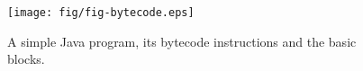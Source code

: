 
\begin{figure}[!ht]
\begin{center}
\texttt{[image: fig/fig-bytecode.eps]}
\caption{A simple Java program, its bytecode instructions and the
basic blocks.}\label{fig-bytecode}
\end{center}
\end{figure}


\begin{comment}
\scriptsize
\begin{tabular}{lll}
\begin{minipage}{0.3\textwidth}
\begin{verbatim}

01 public class Vet {
02     int v[];
03     float out;
04
05     float average( int[] in )
06     {
07         v = in;
08         out = 0.0f;
09         int i = 0;
10         try {
11             while ( i < v.length )
12             {
13                 out += v[i];
14                 i++;
15             }
16             out = out / i;
17         }
18         catch( Exception e )
19         {
20             out = 0.0f;
21             i = 0;
22         }
23         finally
24         {
25             v = null;
26         }
27         print( (float) i );
28         return out;
29     }
30
31     public void print( float n )
32     {
33         System.out.print( n + "\n" );
34     }
35 }


\end{comment}
